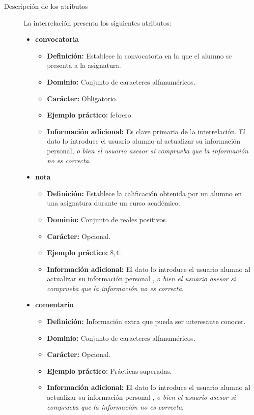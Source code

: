 \begin{description}
      \item[Descripción de los atributos] La interrelación presenta los
      siguientes atributos:

       \begin{itemize}
        \item \textbf{convocatoria}
          \begin{itemize}
            \item \textbf{Definición:} Establece la convocatoria en la que el
            alumno se presenta a la asignatura.
            \item \textbf{Dominio:} Conjunto de caracteres alfanuméricos.
            \item \textbf{Carácter:} Obligatorio.
            \item \textbf{Ejemplo práctico:} febrero.
            \item \textbf{Información adicional:} Es clave primaria de la
            interrelación. El dato lo introduce el usuario alumno al actualizar
            su información personal, \textit{o bien el usuario asesor si
            comprueba que la información no es correcta}.
         \end{itemize}
         \item \textbf{nota}
          \begin{itemize}
            \item \textbf{Definición:} Establece la calificación obtenida por un
            alumno en una asignatura durante un curso académico.
            \item \textbf{Dominio:} Conjunto de reales positivos.
            \item \textbf{Carácter:} Opcional.
            \item \textbf{Ejemplo práctico:} 8,4.
            \item \textbf{Información adicional:} El dato lo introduce el
            usuario alumno al actualizar su información personal , \textit{o
            bien el usuario asesor si comprueba que la información no es
            correcta}.
         \end{itemize}
          \item \textbf{comentario}
          \begin{itemize}
            \item \textbf{Definición:} Información extra que pueda ser
            interesante conocer.
            \item \textbf{Dominio:} Conjunto de caracteres alfanuméricos.
            \item \textbf{Carácter:} Opcional.
            \item \textbf{Ejemplo práctico:} Prácticas superadas.
            \item \textbf{Información adicional:} El dato lo introduce el
            usuario alumno al actualizar su información personal , \textit{o
            bien el usuario asesor si comprueba que la información no es
            correcta}.
         \end{itemize}
       \end{itemize}


\end{description}
